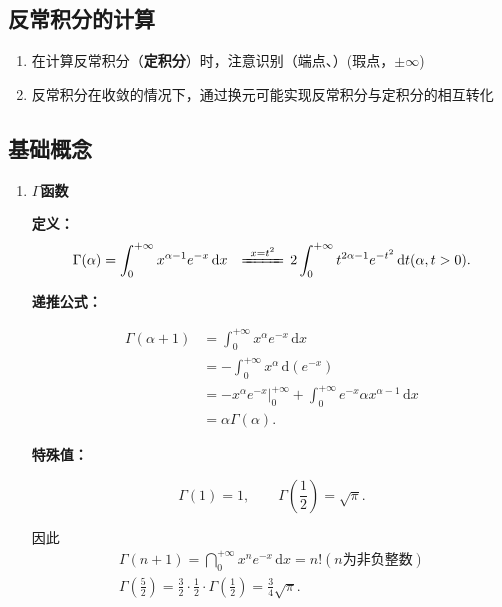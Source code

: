 \documentclass[../book.tex]{subfiles}
\begin{document}
    \subsection{反常积分的计算}

    \begin{enumerate}
        \item 在计算反常积分（\textbf{定积分}）时，注意识别{\color{red}{奇点}}（端点、{\color{red}{内部}}）(瑕点，$\pm \infty$)
        \item 反常积分在收敛的情况下，通过换元可能实现反常积分与定积分的相互转化
    \end{enumerate}

    \subsection{基础概念}

    \begin{enumerate}
        \item \textbf{$\Gamma$函数}

        \textbf{定义：}
        \[
            \begin{aligned}
                \Gamma(\alpha)
                &= \int_{0}^{+\infty} x^{\alpha-1} e^{-x}\,\mathrm{d}x
                &\xlongequal{\;x=t^2\;} \, 2\int_{0}^{+\infty} t^{2\alpha-1} e^{-t^2}\,\mathrm{d}t (\alpha, t > 0).
            \end{aligned}
        \]

        \textbf{递推公式：}

        \[
            \begin{aligned}
                \Gamma(\alpha+1)
                &= \int_{0}^{+\infty} x^{\alpha} e^{-x}\,\mathrm{d}x \\
                &= -\int_{0}^{+\infty} x^{\alpha}\,\mathrm{d}(e^{-x}) \\
                &= -x^{\alpha} e^{-x}\Big|_{0}^{+\infty}
                + \int_{0}^{+\infty} e^{-x}\alpha x^{\alpha-1}\,\mathrm{d}x \\
                &= \alpha \Gamma(\alpha).
            \end{aligned}
        \]

        \textbf{特殊值：}

        \[
            \Gamma(1)=1,
            \qquad
            \Gamma\!\left(\frac{1}{2}\right)=\sqrt{\pi}.
        \]

        因此
        \begin{gather*}
            \Gamma(n+1)= \dint_0^{+\infty} x^{n}e^{-x}\,\mathrm{d}x = n!(n\text{为非负整数}) \\
            \Gamma\!\left(\frac{5}{2}\right)
            = \frac{3}{2}\cdot\frac{1}{2}\cdot\Gamma\!\left(\frac{1}{2}\right)
            = \frac34\sqrt{\pi}.\\
        \end{gather*}
    \end{enumerate}
\end{document}
